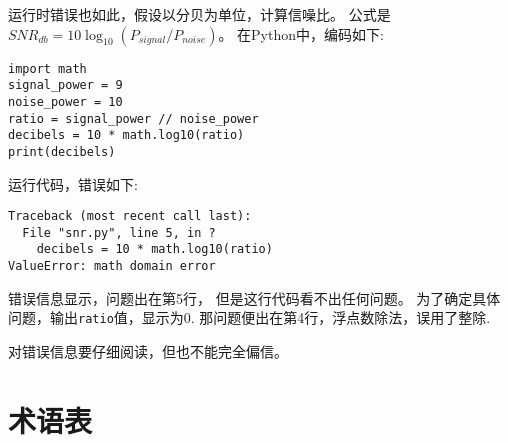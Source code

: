 \documentclass[10pt]{book}
\begin{document}
运行时错误也如此，假设以分贝为单位，计算信噪比。
公式是$SNR_{db} = 10 \log_{10} (P_{signal} / P_{noise})$。
在Python中，编码如下:

\begin{verbatim}
import math
signal_power = 9
noise_power = 10
ratio = signal_power // noise_power
decibels = 10 * math.log10(ratio)
print(decibels)
\end{verbatim}
%
运行代码，错误如下:
%

\begin{verbatim}
Traceback (most recent call last):
  File "snr.py", line 5, in ?
    decibels = 10 * math.log10(ratio)
ValueError: math domain error
\end{verbatim}
%
错误信息显示，问题出在第5行，
但是这行代码看不出任何问题。
为了确定具体问题，输出{\tt ratio}值，显示为0.
那问题便出在第4行，浮点数除法，误用了整除.

对错误信息要仔细阅读，但也不能完全偏信。


\section{术语表}
\end{document}
